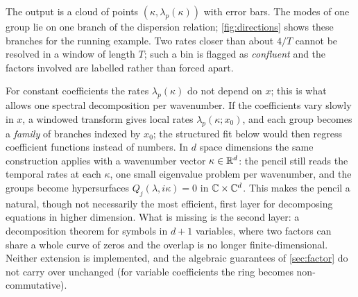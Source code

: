 The output is a cloud of points $(\kappa,\lambda_p(\kappa))$ with error bars. The modes of one group lie
on one branch of the dispersion relation; \cref{fig:directions} shows these branches for the
running example. Two rates closer than about $4/T$ cannot be resolved in a window of length $T$; such
a bin is flagged as \emph{confluent} and the factors involved are labelled \UND{} rather than forced
apart.

\begin{remark}\label{rem:varcoef}
For constant coefficients the rates $\lambda_p(\kappa)$ do not depend on $x$; this is what allows one
spectral decomposition per wavenumber. If the coefficients vary slowly in $x$, a windowed transform
gives local rates $\lambda_p(\kappa;x_0)$, and each group becomes a \emph{family} of branches indexed by
$x_0$; the structured fit below would then regress coefficient functions instead of numbers. In $d$ space dimensions
the same construction applies with a wavenumber vector $\kappa\in\mathbb{R}^d$: the pencil still reads the temporal rates at
each $\kappa$, one small eigenvalue problem per wavenumber, and the groups become hypersurfaces $Q_j(\lambda,i\kappa)=0$
in $\mathbb{C}\times\mathbb{C}^d$. This makes the pencil a natural, though not necessarily the most efficient, first layer for
decomposing equations in higher dimension. What is missing is the second layer: a decomposition theorem for symbols in
$d+1$ variables, where two factors can share a whole curve of zeros and the overlap is no longer finite-dimensional.
Neither extension is implemented, and the algebraic guarantees of \cref{sec:factor} do not carry over unchanged
(for variable coefficients the ring becomes non-commutative).
\end{remark}
